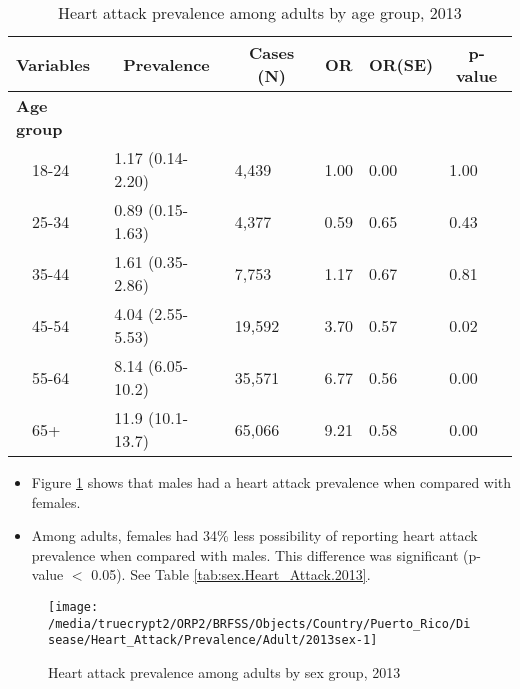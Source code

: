 \begin{table}[H]
\caption{Heart attack prevalence  among adults by age group, 2013\label{tab:age.Heart_Attack.2013}} 
\begin{center}
\begin{tabular}{llllll}
\hline\hline
\multicolumn{1}{l}{Variables}&\multicolumn{1}{c}{Prevalence}&\multicolumn{1}{c}{Cases (N)}&\multicolumn{1}{c}{OR}&\multicolumn{1}{c}{OR(SE)}&\multicolumn{1}{c}{p-value}\tabularnewline
\hline
{\bfseries Age group}&&&&&\tabularnewline
~~18-24&1.17 (0.14-2.20)& 4,439&1.00&0.00&1.00\tabularnewline
~~25-34&0.89 (0.15-1.63)& 4,377&0.59&0.65&0.43\tabularnewline
~~35-44&1.61 (0.35-2.86)& 7,753&1.17&0.67&0.81\tabularnewline
~~45-54&4.04 (2.55-5.53)&19,592&3.70&0.57&0.02\tabularnewline
~~55-64&8.14 (6.05-10.2)&35,571&6.77&0.56&0.00\tabularnewline
~~65+&11.9 (10.1-13.7)&65,066&9.21&0.58&0.00\tabularnewline
\hline
\end{tabular}\end{center}

\end{table}


\newpage
\begin{itemize}

\item Figure \ref{fig:sex.Heart_Attack.2013} shows that males had a 
heart attack prevalence when compared with females.


\item Among adults, females had 34\% less possibility of reporting heart attack prevalence when compared with males. This difference was significant (p-value $<$ 0.05). See Table \ref{tab:sex.Heart_Attack.2013}.

\end{itemize}

\begin{figure}[H]
\caption{Heart attack prevalence among adults by sex group, 
2013}
\begin{knitrout}
\color{fgcolor}

{\centering \texttt{[image: /media/truecrypt2/ORP2/BRFSS/Objects/Country/Puerto\_Rico/Disease/Heart\_Attack/Prevalence/Adult/2013sex-1]} 

}



\end{knitrout}
\label{fig:sex.Heart_Attack.2013}
\end{figure}

